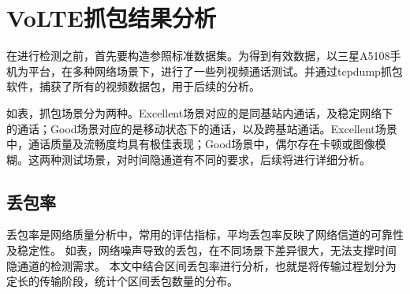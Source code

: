 \section{VoLTE抓包结果分析}
\label{chap:analyze:results}

在进行检测之前，首先要构造参照标准数据集。为得到有效数据，以三星A5108手机为平台，在多种网络场景下，进行了一些列视频通话测试。并通过tcpdump抓包软件，捕获了所有的视频数据包，用于后续的分析。

如表，抓包场景分为两种。Excellent场景对应的是同基站内通话，及稳定网络下的通话；Good场景对应的是移动状态下的通话，以及跨基站通话。Excellent场景中，通话质量及流畅度均具有极佳表现；Good场景中，偶尔存在卡顿或图像模糊。这两种测试场景，对时间隐通道有不同的要求，后续将进行详细分析。

\subsection{丢包率}
\label{chap:analyze:results:plr}

丢包率是网络质量分析中，常用的评估指标，平均丢包率反映了网络信道的可靠性及稳定性。
如表，网络噪声导致的丢包，在不同场景下差异很大，无法支撑时间隐通道的检测需求。
本文中结合区间丢包率进行分析，也就是将传输过程划分为定长的传输阶段，统计个区间丢包数量的分布。

